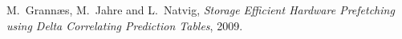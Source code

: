 \documentclass[12pt,journal,compsoc]{IEEEtran}
\begin{document}
\ifCLASSOPTIONcaptionsoff
  \newpage
\fi



\begin{thebibliography}{1}

M.~Grann\ae s, M.~Jahre and L.~Natvig, \emph{Storage Efficient Hardware Prefetching using Delta Correlating Prediction Tables}, 2009.

\end{thebibliography}



\end{document}
